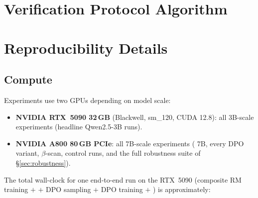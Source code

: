 \section{Verification Protocol Algorithm}
\label{app:verify-algo}

\begin{algorithm}[t]
\small
\caption{\rewardmark{} verification protocol}
\label{alg:verify}
\begin{algorithmic}[1]
  \EndFor
  \State {}
  \EndFor
  \State {}
\EndIf
\end{algorithmic}
\end{algorithm}

\section{Reproducibility Details}
\label{app:repro}

\subsection{Compute}
\label{app:compute}

Experiments use two GPUs depending on model scale:
\begin{itemize}[leftmargin=*,topsep=0pt,itemsep=2pt]
  \item \textbf{NVIDIA RTX~5090 32\,GB} (Blackwell, sm\_120, CUDA
    12.8): all 3B-scale experiments (headline Qwen2.5-3B runs).
  \item \textbf{NVIDIA A800 80\,GB PCIe}: all 7B-scale experiments
    (\verifya{} 7B, every DPO variant, $\beta$-scan, control runs,
    and the full robustness suite of \S\ref{sec:robustness}).
\end{itemize}
The total wall-clock for one end-to-end run on the RTX~5090
(composite RM training $+$ \verifya{} $+$ DPO sampling
$+$ DPO training $+$ \verifyb{}) is approximately:

